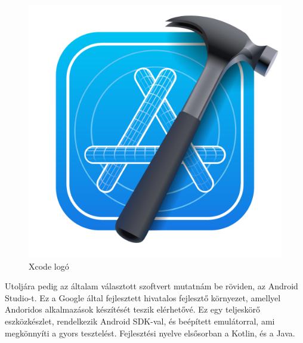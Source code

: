 \begin{figure}[h]
\centering
\includegraphics[scale=0.08]{images/xcode.png}
\caption{Xcode logó}
\label{fig:xcode}
\end{figure}

Utoljára pedig az általam választott szoftvert mutatnám be röviden, az Android Studio-t\cite{AndroidStudio}.
Ez a Google által fejlesztett hivatalos fejlesztő környezet, amellyel Andoridos alkalmazások
készítését teszik elérhetővé. Ez egy teljeskörő eszközkészlet, rendelkezik Android SDK-val, és 
beépített emulátorral, ami megkönnyíti a gyors tesztelést. Fejlesztési nyelve elsősorban a Kotlin, és a Java.

